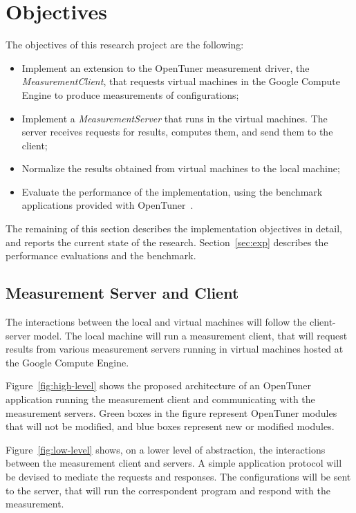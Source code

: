 \documentclass[a4paper, 12pt]{article}
\begin{document}
\section{Objectives} \label{sec:obj}

The objectives of this research project are the following:

\begin{itemize}
    \item Implement an extension to the OpenTuner measurement driver,
        the \emph{MeasurementClient}, that requests virtual 
        machines in the Google Compute Engine to produce 
        measurements of configurations;
    \item Implement a \emph{MeasurementServer} that runs
        in the virtual machines. The server receives
        requests for results, computes them, and send
        them to the client;
    \item Normalize the results obtained from virtual machines
        to the local machine;
    \item Evaluate the performance of the implementation,
        using the benchmark applications provided with
        OpenTuner~\cite{ansel2014opentuner}.
\end{itemize}

The remaining of this section describes the implementation objectives in 
detail, and reports the current state of the research. Section~\ref{sec:exp}
describes the performance evaluations and the benchmark.

\subsection{Measurement Server and Client}

The interactions between the local and virtual machines
will follow the client-server model. The local machine
will run a measurement client, that will request
results from various measurement servers running in
virtual machines hosted at the Google Compute Engine.

Figure~\ref{fig:high-level} shows the proposed architecture
of an OpenTuner application running the measurement
client and communicating with the measurement servers.
Green boxes in the figure represent OpenTuner modules 
that will not be modified, and blue boxes represent
new or modified modules.

Figure~\ref{fig:low-level} shows, on a lower level
of abstraction, the interactions between the measurement
client and servers. A simple application protocol
will be devised to mediate the requests and responses.
The configurations will be sent to the server, that
will run the correspondent program and respond with
the measurement.
\end{document}
